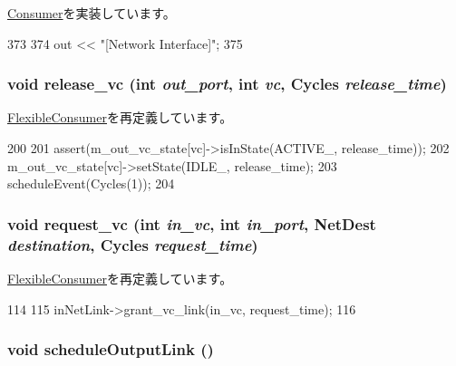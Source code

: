 \hyperlink{classConsumer_a3ea5f7af5db62cc24f4e40df9ea5c971}{Consumer}を実装しています。


\begin{DoxyCode}
373 {
374     out << "[Network Interface]";
375 }
\end{DoxyCode}
\hypertarget{classNetworkInterface_adced7fd7d25eb0d6a869fff14085e8c3}{
\subsubsection[{release\_\-vc}]{\setlength{\rightskip}{0pt plus 5cm}void release\_\-vc (int {\em out\_\-port}, \/  int {\em vc}, \/  {\bf Cycles} {\em release\_\-time})}}
\label{classNetworkInterface_adced7fd7d25eb0d6a869fff14085e8c3}


\hyperlink{classFlexibleConsumer_a54d4f8948ced53110ed96024a64adf7e}{FlexibleConsumer}を再定義しています。


\begin{DoxyCode}
200 {
201     assert(m_out_vc_state[vc]->isInState(ACTIVE_, release_time));
202     m_out_vc_state[vc]->setState(IDLE_, release_time);
203     scheduleEvent(Cycles(1));
204 }
\end{DoxyCode}
\hypertarget{classNetworkInterface_ac2db714adfe0dfd2c3ac2b88bd6a5308}{
\subsubsection[{request\_\-vc}]{\setlength{\rightskip}{0pt plus 5cm}void request\_\-vc (int {\em in\_\-vc}, \/  int {\em in\_\-port}, \/  {\bf NetDest} {\em destination}, \/  {\bf Cycles} {\em request\_\-time})}}
\label{classNetworkInterface_ac2db714adfe0dfd2c3ac2b88bd6a5308}


\hyperlink{classFlexibleConsumer_aa0ffe58ceb5a05129736d59f3eeabcf0}{FlexibleConsumer}を再定義しています。


\begin{DoxyCode}
114 {
115     inNetLink->grant_vc_link(in_vc, request_time);
116 }
\end{DoxyCode}
\hypertarget{classNetworkInterface_a0b5091af4210988da9a7eeb44e5691e4}{
\subsubsection[{scheduleOutputLink}]{\setlength{\rightskip}{0pt plus 5cm}void scheduleOutputLink ()}}
\label{classNetworkInterface_a0b5091af4210988da9a7eeb44e5691e4}



